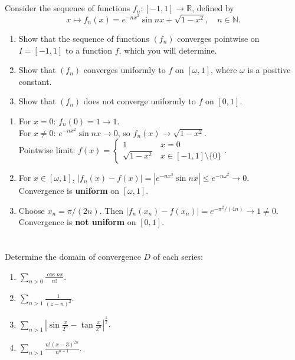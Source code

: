 \documentclass[12pt]{article}
\begin{document}
\section{}
Consider the sequence of functions $f_n : [-1, 1] \to \mathbb{R}$, defined by
$$x \mapsto f_n(x) = e^{-nx^2}\sin nx + \sqrt{1-x^2}, \quad n \in \mathbb{N}.$$

\begin{enumerate}
    \item Show that the sequence of functions $(f_n)$ converges pointwise on $I = [-1, 1]$ to a function $f$, which you will determine.
    \item Show that $(f_n)$ converges uniformly to $f$ on $[\omega, 1]$, where $\omega$ is a positive constant.
    \item Show that $(f_n)$ does not converge uniformly to $f$ on $[0, 1]$.
\end{enumerate}

\begin{correctionbox}
\begin{enumerate}
    \item For $x=0$: $f_n(0)=1 \to 1$. \\
    For $x\neq0$: $e^{-nx^2}\sin nx \to 0$, so $f_n(x)\to\sqrt{1-x^2}$. \\
    Pointwise limit: $f(x)=\begin{cases} 1 & x=0 \\ \sqrt{1-x^2} & x\in[-1,1]\setminus\{0\} \end{cases}$.

    \item For $x\in[\omega,1]$, $|f_n(x)-f(x)| = |e^{-nx^2}\sin nx| \leq e^{-n\omega^2} \to 0$. \\
    Convergence is \textbf{uniform} on $[\omega,1]$.

    \item Choose $x_n=\pi/(2n)$. Then $|f_n(x_n)-f(x_n)| = e^{-\pi^2/(4n)} \to 1 \neq 0$. \\
    Convergence is \textbf{not uniform} on $[0,1]$.
\end{enumerate}
\end{correctionbox}

\section{}
Determine the domain of convergence $D$ of each series:

\begin{enumerate}
    \item $\sum_{n>0} \frac{\cos nx}{n!}$.
    \item $\sum_{n>1} \frac{1}{(z-n)^2}$.
    \item $\sum_{n>1} \left|\sin\frac{x}{2^n} - \tan\frac{x}{2^n}\right|^{\frac{1}{2}}$.
    \item $\sum_{n>1} \frac{n!(x-3)^{2n}}{n^{n+1}}$.
\end{enumerate}
\end{document}
